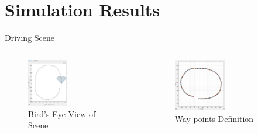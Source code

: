 \documentclass[10pt]{beamer}
\begin{document}


\section{Simulation Results}


\begin{frame}{Driving Scene}
  \begin{columns}
       \begin{figure}
           \centering
           \includegraphics[width=0.45\textwidth]{Images/Drivingscene.png}
           \caption{Bird's Eye View of Scene}
       \end{figure}
       
       \begin{figure}
           \centering
           \includegraphics[width=0.5\textwidth]{Images/waypoints.png}
           \caption{Way points Definition}
       \end{figure}
  \end{columns}
  

\end{frame}
\end{document}

